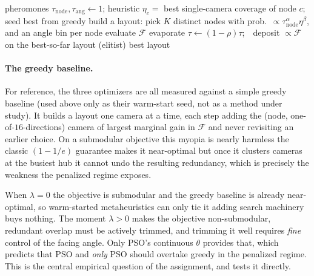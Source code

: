 \documentclass{ai-lab-report}
\begin{document}
\begin{algorithm}[H]
\caption{Ant Colony Optimization (subset selection of $K$ intersections $+$ discrete angles).}
\label{alg:a3aco}
\begin{algorithmic}[1]
\State pheromones $\tau_{\text{node}},\tau_{\text{ang}}\gets1$; heuristic $\eta_c=$ best single-camera coverage of node $c$; seed best from greedy
    \State build a layout: pick $K$ distinct nodes with prob.\ $\propto\tau_{\text{node}}^{\alpha}\eta^{\beta}$, and an angle bin per node
    \State evaluate $\mathcal F$
  \EndFor
  \State evaporate $\tau\gets(1-\rho)\tau$;\ \ deposit $\propto\mathcal F$ on the best-so-far layout (elitist)
\EndFor
\State \Return best layout
\end{algorithmic}
\end{algorithm}

\paragraph{The greedy baseline.}
For reference, the three optimizers are all measured against a simple greedy baseline (used above only as their warm-start seed, not as a method under study). It builds a layout one camera at a time, each step adding the (node, one-of-$16$-directions) camera of largest marginal gain in $\mathcal F$ and never revisiting an earlier choice. On a submodular objective this myopia is nearly harmless the classic $(1-1/e)$ guarantee makes it near-optimal but once it clusters cameras at the busiest hub it cannot undo the resulting redundancy, which is precisely the weakness the penalized regime exposes.

When $\lambda=0$ the objective is submodular and the greedy baseline is already near-optimal, so warm-started metaheuristics can only tie it adding search machinery buys nothing. The moment $\lambda>0$ makes the objective non-submodular, redundant overlap must be actively trimmed, and trimming it well requires \emph{fine} control of the facing angle. Only PSO's continuous $\theta$ provides that, which predicts that PSO and \emph{only} PSO should overtake greedy in the penalized regime. This is the central empirical question of the assignment, and  tests it directly.
\end{document}
